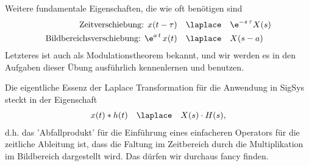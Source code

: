 Weitere fundamentale Eigenschaften, die wie oft benötigen sind
\begin{align}
\text{Zeitverschiebung:   } x(t-\tau)& \quad\laplace\quad \e^{-s\,\tau} X(s)\\
\text{Bildbereichsverschiebung:   } \e^{a\,t} \, x(t)& \quad\laplace\quad X(s-a)
\end{align}
Letzteres ist auch als Modulationstheorem bekannt, und wir werden es in den
Aufgaben dieser Übung ausführlich kennenlernen und benutzen.

Die eigentliche Essenz der Laplace Transformation für die Anwendung in
SigSys steckt in der Eigenschaft
\begin{align}
\label{eq:laplace_intro_ast_mult}
x(t) \ast h(t) \quad\laplace\quad X(s) \cdot H(s),
\end{align}
d.h. das 'Abfallprodukt' für die Einführung eines einfacheren Operators
für die zeitliche Ableitung ist, dass die Faltung im Zeitbereich durch die
Multiplikation im Bildbereich dargestellt wird. Das dürfen wir durchaus fancy finden.

